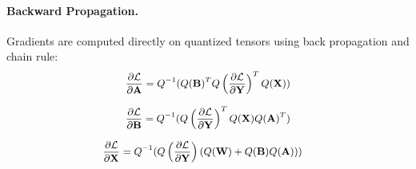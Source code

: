 \paragraph{Backward Propagation.}
Gradients are computed directly on quantized tensors using back propagation and chain rule:
\begin{equation*}
\small
\begin{aligned}
\vspace{-2mm}
\label{back_a}
\frac{\partial \mathcal{L}}{\partial \mathbf{A}} = Q^{-1}(Q(\mathbf{B})^TQ\left( \frac{\partial \mathcal{L}}{\partial \mathbf{Y}} \right)^T Q(\mathbf{X})) 
\end{aligned}
\end{equation*}

\vspace{-3mm}

\begin{equation*}
\small
\begin{aligned}
\vspace{-2mm}
\label{back_b}
\frac{\partial \mathcal{L}}{\partial \mathbf{B}} = Q^{-1}(Q\left(\frac{\partial \mathcal{L}}{\partial \mathbf{Y}}\right)^T Q(\mathbf{X})Q(\mathbf{A})^T) \\
\end{aligned}
\end{equation*}

\vspace{-3mm}

\begin{equation*}
\small
\begin{aligned}
\vspace{-2mm}
\label{back_x}
 \frac{\partial \mathcal{L}}{\partial \mathbf{X}} &= Q^{-1}(Q\left(\frac{\partial \mathcal{L}}{\partial \mathbf{Y}}\right)\left( Q(\mathbf{W}) + Q(\mathbf{B}) Q(\mathbf{A}) \right))
\end{aligned}
\end{equation*}
